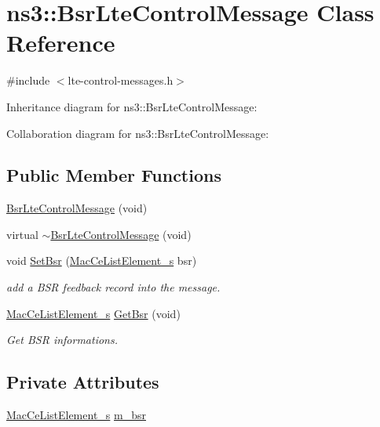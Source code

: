 \hypertarget{classns3_1_1BsrLteControlMessage}{}\section{ns3\+:\+:Bsr\+Lte\+Control\+Message Class Reference}
\label{classns3_1_1BsrLteControlMessage}


{\ttfamily \#include $<$lte-\/control-\/messages.\+h$>$}



Inheritance diagram for ns3\+:\+:Bsr\+Lte\+Control\+Message\+:


Collaboration diagram for ns3\+:\+:Bsr\+Lte\+Control\+Message\+:
\subsection*{Public Member Functions}
\begin{DoxyCompactItemize}
\item 
\hyperlink{classns3_1_1BsrLteControlMessage_a9fb0278f2f99e5a73a158e2fa41bf4aa}{Bsr\+Lte\+Control\+Message} (void)
\item 
virtual \hyperlink{classns3_1_1BsrLteControlMessage_a7030f6f9cc31df6dbfb3ff9825df73bc}{$\sim$\+Bsr\+Lte\+Control\+Message} (void)
\item 
void \hyperlink{classns3_1_1BsrLteControlMessage_aef6203661f6b03acca58a973db0fd037}{Set\+Bsr} (\hyperlink{structns3_1_1MacCeListElement__s}{Mac\+Ce\+List\+Element\+\_\+s} bsr)
\begin{DoxyCompactList}\small\item\em add a B\+SR feedback record into the message. \end{DoxyCompactList}\item 
\hyperlink{structns3_1_1MacCeListElement__s}{Mac\+Ce\+List\+Element\+\_\+s} \hyperlink{classns3_1_1BsrLteControlMessage_a5d079fdc8ed88ef8feac6c0985dc1f1d}{Get\+Bsr} (void)
\begin{DoxyCompactList}\small\item\em Get B\+SR informations. \end{DoxyCompactList}\end{DoxyCompactItemize}
\subsection*{Private Attributes}
\begin{DoxyCompactItemize}
\item 
\hyperlink{structns3_1_1MacCeListElement__s}{Mac\+Ce\+List\+Element\+\_\+s} \hyperlink{classns3_1_1BsrLteControlMessage_a1215ef8fe45db0fd234d71a7550ab8dd}{m\+\_\+bsr}
\end{DoxyCompactItemize}

